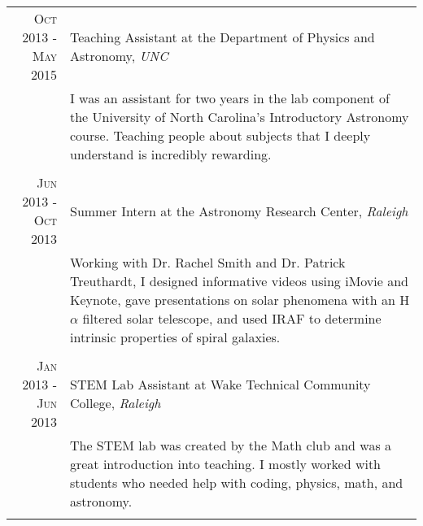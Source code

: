 \documentclass[a4paper,10pt]{article} %
\begin{document}
\begin{tabular}{r|p{11cm}}

\textsc{Oct 2013 - May 2015} & Teaching Assistant at the Department of Physics and Astronomy, \emph{UNC} \\
& \footnotesize{I was an assistant for two years in the lab component of the University of North Carolina's Introductory Astronomy course. Teaching people about subjects that I deeply understand is incredibly rewarding.}\\
\multicolumn{2}{c}{} \\


\textsc{Jun 2013 - Oct 2013} & Summer Intern at the Astronomy Research Center, \emph{Raleigh}\\
& \footnotesize{Working with Dr. Rachel Smith and Dr. Patrick Treuthardt, I designed informative videos using iMovie and Keynote, gave presentations on solar phenomena with an H$\alpha$ filtered solar telescope, and used IRAF to determine intrinsic properties of spiral galaxies.}\\
\multicolumn{2}{c}{} \\


\textsc{Jan 2013 - Jun 2013} & STEM Lab Assistant at Wake Technical Community College, \emph{Raleigh}\\
& \footnotesize{The STEM lab was created by the Math club and was a great introduction into teaching. I mostly worked with students who needed help with coding, physics, math, and astronomy.}\\
\multicolumn{2}{c}{} \\


\end{tabular}
\end{document}
